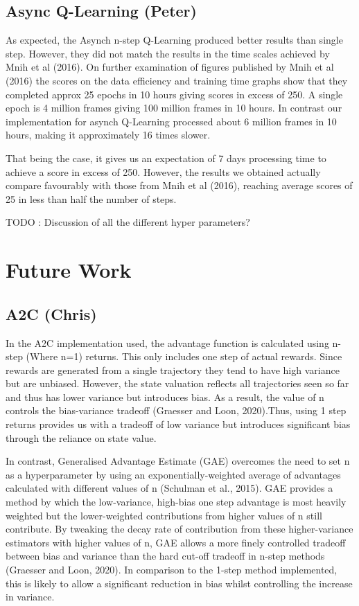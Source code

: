 \documentclass{article}
\begin{document}
\subsection{Async Q-Learning (Peter)}

As expected, the Asynch n-step Q-Learning produced better results than single step. However, they did not match the results in the time scales achieved by Mnih et al (2016). On further examination of figures published by Mnih et al (2016) the scores on the data efficiency and training time graphs show that they completed approx 25 epochs in 10 hours giving scores in excess of 250. A single epoch is 4 million frames giving 100 million frames in 10 hours. In contrast our implementation for asynch Q-Learning processed about 6 million frames in 10 hours, making it approximately 16 times slower.

That being the case, it gives us an expectation of 7 days processing time to achieve a score in excess of 250. However, the results we obtained actually compare favourably with those from Mnih et al (2016), reaching average scores of 25 in less than half the number of steps.

TODO : Discussion of all the different hyper parameters?

\section{Future Work}


\subsection{A2C (Chris)}

In the A2C implementation used, the advantage function is calculated using n-step (Where n=1) returns. This only includes one step of actual rewards. Since rewards are generated from a single trajectory they tend to have high variance but are unbiased. However, the state valuation reflects all trajectories seen so far and thus has lower variance but introduces bias. As a result, the value of n controls the bias-variance tradeoff (Graesser and Loon, 2020).Thus, using 1 step returns provides us with a tradeoff of low variance but introduces significant bias through the reliance on state value.

In contrast, Generalised Advantage Estimate (GAE) overcomes the need to set n as a hyperparameter by using an exponentially-weighted average of advantages calculated with different values of n (Schulman et al., 2015). GAE provides a  method by which the low-variance, high-bias one step advantage is most heavily weighted but the lower-weighted contributions from higher values of n still contribute. By tweaking the decay rate of contribution from these higher-variance estimators with higher values of n, GAE allows a more finely controlled tradeoff between bias and variance than the hard cut-off tradeoff in n-step methods (Graesser and Loon, 2020). In comparison to the 1-step method implemented, this is likely to allow a significant reduction in bias whilst controlling the increase in variance.
\end{document}
